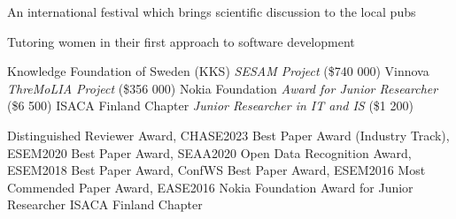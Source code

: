 \documentclass[9pt]{article}
\begin{document}
\bigskip
{}

 
\newline\noindent An international festival which brings scientific discussion to the local pubs\bigskip
\bigskip

 
\newline\noindent Tutoring women in their first approach to software development\bigskip
\bigskip

\noindent Knowledge Foundation of Sweden (KKS) \textit{SESAM Project} (\$740 000)  
\newline\noindent Vinnova \textit{ThreMoLIA Project} (\$356 000)  
\newline\noindent Nokia Foundation \textit{Award for Junior Researcher} (\$6 500)
\newline\noindent ISACA Finland Chapter \textit{Junior Researcher in IT and IS} (\$1 200)
\bigskip

\noindent Distinguished Reviewer Award, CHASE2023 
\newline\noindent Best Paper Award (Industry Track), ESEM2020 
\newline\noindent Best Paper Award, SEAA2020 
\newline\noindent Open Data Recognition Award, ESEM2018 
\newline\noindent Best Paper Award, ConfWS 
\newline\noindent Best Paper Award, ESEM2016 
\newline\noindent Most Commended Paper Award, EASE2016 
\newline\noindent Nokia Foundation Award for Junior Researcher 
\newline\noindent ISACA Finland Chapter
\bigskip


{}

\vspace{-0.02in}
 
\newline{}
\end{document}
